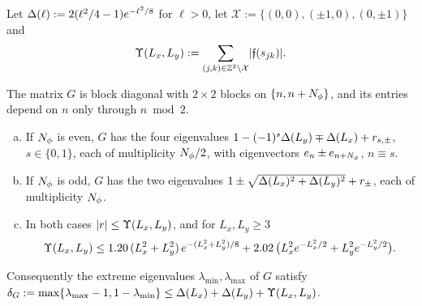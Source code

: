 Let $\Delta(\ell):=2(\ell^2/4-1)e^{-\ell^2/8}$ for $\ell>0$, let $\mathcal X:=\{(0,0),(\pm1,0),(0,\pm1)\}$ and
\[
\Upsilon(L_x,L_y):=\sum_{(j,k)\in\mathbb{Z}^2\setminus\mathcal X}\lvert\mathfrak f(s_{jk})\rvert .
\]

\begin{lemma}\label{lem:levels}
The matrix $G$ is block diagonal with $2\times2$ blocks on $\{n,n+N_{\phi}\}$, and its entries depend on $n$ only through
$n\bmod2$.
\begin{enumerate}[(a)]
\item If $N_{\phi}$ is even, $G$ has the four eigenvalues $1-(-1)^s\Delta(L_y)\mp\Delta(L_x)+r_{s,\pm}$, $s\in\{0,1\}$, each of
multiplicity $N_{\phi}/2$, with eigenvectors $e_n\pm e_{n+N_{\phi}}$, $n\equiv s$.
\item If $N_{\phi}$ is odd, $G$ has the two eigenvalues $1\pm\sqrt{\Delta(L_x)^2+\Delta(L_y)^2}+r_\pm$, each of multiplicity $N_{\phi}$.
\item In both cases $\lvert r\rvert\le\Upsilon(L_x,L_y)$, and for $L_x,L_y\ge3$
\[
\Upsilon(L_x,L_y)\le1.20\,(L_x^2+L_y^2)\,e^{-(L_x^2+L_y^2)/8}+2.02\,\bigl(L_x^2e^{-L_x^2/2}+L_y^2e^{-L_y^2/2}\bigr).
\]
\end{enumerate}
Consequently the extreme eigenvalues $\lambda_{\min},\lambda_{\max}$ of $G$ satisfy
$\delta_G:=\max\{\lambda_{\max}-1,1-\lambda_{\min}\}\le\Delta(L_x)+\Delta(L_y)+\Upsilon(L_x,L_y)$.
\end{lemma}

